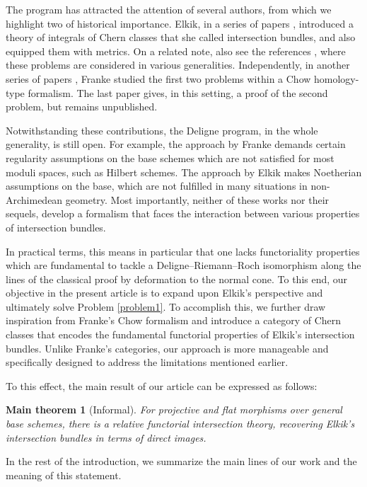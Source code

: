 \documentclass[11pt]{article}
\theoremstyle{plain}
\newtheorem*{theoremMeta}{Main theorem}
\theoremstyle{definition}
\begin{document}
The program has attracted the attention of several authors, from which we highlight two of historical importance. Elkik, in a series of papers \cite{Elkikfib, Elkikmetr}, introduced a theory of integrals of Chern classes that she called intersection bundles, and also equipped them with metrics. On a related note, also see the references \cite{Boucksom-Eriksson, Ducrot, Munoz}, where these problems are considered in various generalities. Independently, in another series of papers \cite{FrankeChow, FrankeChern, Franke}, Franke studied the first two problems within a Chow homology-type formalism. The last paper gives, in this setting, a proof of the second problem, but remains unpublished.

Notwithstanding these contributions, the Deligne program, in the whole generality, is still open. For example, the approach by Franke demands certain regularity assumptions on the base schemes which are not satisfied for most moduli spaces, such as Hilbert schemes. The approach by Elkik makes Noetherian assumptions on the base, which are not fulfilled in many situations in non-Archimedean geometry. Most importantly, neither of these works nor their sequels, develop a formalism that faces the interaction between various properties of intersection bundles.

In practical terms, this means in particular that one lacks functoriality properties which are fundamental to tackle a Deligne--Riemann--Roch isomorphism along the lines of the classical proof by deformation to the normal cone. To this end, our objective in the present article is to expand upon Elkik's perspective and ultimately solve Problem \ref{problem1}. To accomplish this, we further draw inspiration from Franke's Chow formalism and introduce a category of
Chern classes that encodes the fundamental functorial properties of Elkik's intersection bundles. Unlike Franke's categories, our approach is more manageable and specifically designed to address the limitations mentioned earlier.

To this effect, the main result of our article can be expressed as follows:

\begin{theoremMeta} [Informal]
For projective and flat morphisms over general base schemes, there is a relative functorial intersection theory, recovering Elkik's intersection bundles in terms of direct images.
\end{theoremMeta}

In the rest of the introduction, we summarize the main lines of our work and the meaning of this statement.
\end{document}
